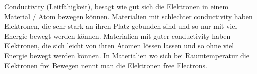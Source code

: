 \documentclass[../Elektrizitaet.tex]{subfiles}
\begin{document}
Conductivity (Leitfähigkeit), besagt wie gut sich die Elektronen in einem Material / Atom bewegen können.  
Materialien mit schlechter conductivity haben Elektronen, die sehr stark an ihren Platz gebunden sind und so nur mit viel Energie bewegt werden können.  
Materialien mit guter conductivity haben Elektronen, die sich leicht von ihren Atomen lössen lassen und so ohne viel Energie bewegt werden können.  
In Materialien wo sich bei Raumtemperatur die Elektronen frei Bewegen nennt man die Elektronen free Electrons.
\end{document}
